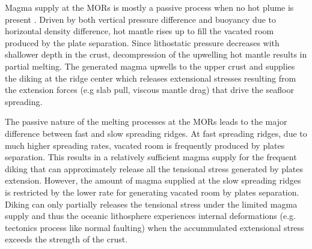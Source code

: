 %

Magma supply at the MORs is mostly a passive process when no hot plume is present \citep{Fowler2004}. Driven by both vertical pressure difference and buoyancy due to horizontal density difference, hot mantle rises up to fill the vacated room produced by the plate separation. Since lithostatic pressure decreases with shallower depth in the crust, decompression of the upwelling hot mantle results in partial melting. The generated magma upwells to the upper crust and supplies the diking at the ridge center which releases extensional stresses resulting from the extension forces (e.g slab pull, viscous mantle drag) that drive the seafloor spreading.

The passive nature of the melting processes at the MORs leads to the major difference between fast and slow spreading ridges. At fast spreading ridges, due to much higher spreading rates, vacated room is frequently produced by plates separation. This results in a relatively sufficient magma supply for the frequent diking that can approximately release all the tensional stress generated by plates extension. However, the amount of magma supplied at the slow spreading ridges is restricted by the lower rate for generating vacated room by plates separation. Diking can only partially releases the tensional stress under the limited magma supply and thus the oceanic lithosphere experiences internal deformations (e.g. tectonics process like normal faulting) when the accummulated extensional stress exceeds the strength of the crust.

